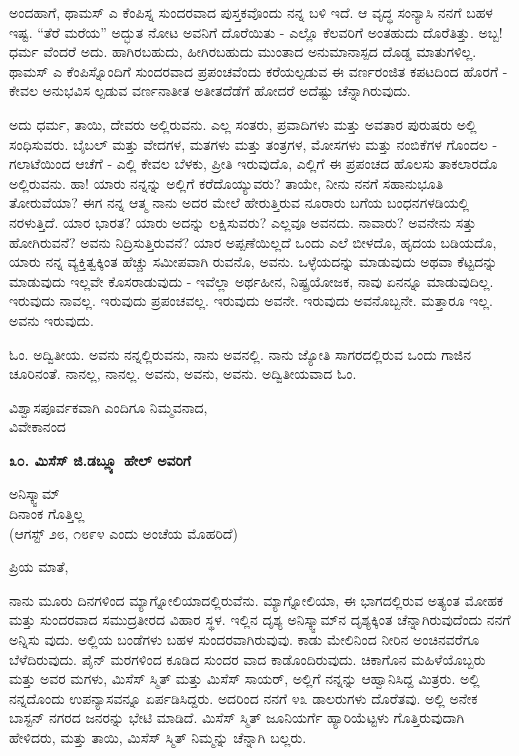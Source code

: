 ಅಂದಹಾಗೆ, ಥಾಮಸ್ ಎ ಕೆಂಪಿಸ್ನ ಸುಂದರವಾದ ಪುಸ್ತಕವೊಂದು ನನ್ನ ಬಳಿ ಇದೆ. ಆ ವೃದ್ಧ ಸಂನ್ಯಾಸಿ ನನಗೆ ಬಹಳ ಇಷ್ಟ. “ತೆರೆ ಮರೆಯ” ಅದ್ಭುತ ನೋಟ ಅವನಿಗೆ ದೊರೆಯಿತು - ಎಲ್ಲೊ ಕೆಲವರಿಗೆ ಅಂತಹುದು ದೊರೆತಿತ್ತು. ಅಬ್ಬ! ಧರ್ಮ ವೆಂದರೆ ಅದು. ಹಾಗಿರಬಹುದು, ಹೀಗಿರಬಹುದು ಮುಂತಾದ ಅನುಮಾನಾಸ್ಪದ ದೊಡ್ಡ ಮಾತುಗಳಿಲ್ಲ. ಥಾಮಸ್ ಎ ಕೆಂಪಿಸ್ನೊಂದಿಗೆ ಸುಂದರವಾದ ಪ್ರಪಂಚವೆಂದು ಕರೆಯಲ್ಪಡುವ ಈ ವರ್ಣರಂಜಿತ ಕಪಟದಿಂದ ಹೊರಗೆ - ಕೇವಲ ಅನುಭವಿಸ ಲ್ಪಡುವ ವರ್ಣನಾತೀತ ಅತೀತದೆಡೆಗೆ ಹೋದರೆ ಅದೆಷ್ಟು ಚೆನ್ನಾಗಿರುವುದು.

ಅದು ಧರ್ಮ, ತಾಯಿ, ದೇವರು ಅಲ್ಲಿರುವನು. ಎಲ್ಲ ಸಂತರು, ಪ್ರವಾದಿಗಳು ಮತ್ತು ಅವತಾರ ಪುರುಷರು ಅಲ್ಲಿ ಸಂಧಿಸುವರು. ಬೈಬಲ್ ಮತ್ತು ವೇದಗಳ, ಮತಗಳು ಮತ್ತು ತಂತ್ರಗಳ, ಮೋಸಗಳು ಮತ್ತು ನಂಬಿಕೆಗಳ ಗೊಂದಲ - ಗಲಾಟೆಯಿಂದ ಆಚೆಗೆ - ಎಲ್ಲಿ ಕೇವಲ ಬೆಳಕು, ಪ್ರೀತಿ ಇರುವುದೊ, ಎಲ್ಲಿಗೆ ಈ ಪ್ರಪಂಚದ ಹೊಲಸು ತಾಕಲಾರದೊ ಅಲ್ಲಿರುವನು. ಹಾ! ಯಾರು ನನ್ನನ್ನು ಅಲ್ಲಿಗೆ ಕರೆದೊಯ್ಯುವರು? ತಾಯೇ, ನೀನು ನನಗೆ ಸಹಾನುಭೂತಿ ತೋರುವೆಯಾ? ಈಗ ನನ್ನ ಆತ್ಮ ನಾನು ಅದರ ಮೇಲೆ ಹೇರುತ್ತಿರುವ ನೂರಾರು ಬಗೆಯ ಬಂಧನಗಳಡಿಯಲ್ಲಿ ನರಳುತ್ತಿದೆ. ಯಾರ ಭಾರತ? ಯಾರು ಅದನ್ನು ಲಕ್ಷಿಸುವರು? ಎಲ್ಲವೂ ಅವನದು. ನಾವಾರು? ಅವನೇನು ಸತ್ತು ಹೋಗಿರುವನೆ? ಅವನು ನಿದ್ರಿಸುತ್ತಿರುವನೆ? ಯಾರ ಅಪ್ಪಣೆಯಿಲ್ಲದೆ ಒಂದು ಎಲೆ ಬೀಳದೊ, ಹೃದಯ ಬಡಿಯದೊ, ಯಾರು ನನ್ನ ವ್ಯಕ್ತಿತ್ವಕ್ಕಿಂತ ಹೆಚ್ಚು ಸಮೀಪವಾಗಿ ರುವನೊ, ಅವನು. ಒಳ್ಳೆಯದನ್ನು ಮಾಡುವುದು ಅಥವಾ ಕೆಟ್ಟದನ್ನು ಮಾಡುವುದು ಇಲ್ಲವೇ ಕೊಸರಾಡುವುದು - ಇವೆಲ್ಲಾ ಅರ್ಥಹೀನ, ನಿಷ್ಪ್ರಯೋಜಕ, ನಾವು ಏನನ್ನೂ ಮಾಡುವುದಿಲ್ಲ. ಇರುವುದು ನಾವಲ್ಲ. ಇರುವುದು ಪ್ರಪಂಚವಲ್ಲ. ಇರುವುದು ಅವನೇ. ಇರುವುದು ಅವನೊಬ್ಬನೇ. ಮತ್ತಾರೂ ಇಲ್ಲ. ಅವನು ಇರುವುದು.

ಓಂ. ಅದ್ವಿತೀಯ. ಅವನು ನನ್ನಲ್ಲಿರುವನು, ನಾನು ಅವನಲ್ಲಿ. ನಾನು ಜ್ಯೋತಿ ಸಾಗರದಲ್ಲಿರುವ ಒಂದು ಗಾಜಿನ ಚೂರಿನಂತೆ. ನಾನಲ್ಲ, ನಾನಲ್ಲ. ಅವನು, ಅವನು, ಅವನು. ಅದ್ವಿತೀಯವಾದ ಓಂ.

\begin{flushright}
ವಿಶ್ವಾಸಪೂರ್ವಕವಾಗಿ ಎಂದಿಗೂ ನಿಮ್ಮವನಾದ,\\ವಿವೇಕಾನಂದ
\end{flushright}

\begin{center}
\textbf{೩೦. ಮಿಸೆಸ್ ಜಿ.ಡಬ್ಲ್ಯೂ ಹೇಲ್ ಅವರಿಗೆ}
\end{center}

\begin{flushright}
ಅನಿಸ್ಕ್ವಾಮ್​\\ದಿನಾಂಕ ಗೊತ್ತಿಲ್ಲ\\(ಆಗಸ್ಟ್ ೨೮, ೧೮೯೪ ಎಂದು ಅಂಚೆಯ ಮೊಹರಿದೆ)
\end{flushright}

ಪ್ರಿಯ ಮಾತೆ,

ನಾನು ಮೂರು ದಿನಗಳಿಂದ ಮ್ಯಾಗ್ನೋಲಿಯಾದಲ್ಲಿರುವೆನು. ಮ್ಯಾಗ್ನೋಲಿಯಾ, ಈ ಭಾಗದಲ್ಲಿರುವ ಅತ್ಯಂತ ಮೋಹಕ ಮತ್ತು ಸುಂದರವಾದ ಸಮುದ್ರತೀರದ ವಿಹಾರ ಸ್ಥಳ. ಇಲ್ಲಿನ ದೃಶ್ಯ ಅನಿಸ್ಕ್ವಾಮ್​ನ ದೃಶ್ಯಕ್ಕಿಂತ ಚೆನ್ನಾಗಿರುವುದೆಂದು ನನಗೆ ಅನ್ನಿಸು ವುದು. ಅಲ್ಲಿಯ ಬಂಡೆಗಳು ಬಹಳ ಸುಂದರವಾಗಿರುವುವು. ಕಾಡು ಮೇಲಿನಿಂದ ನೀರಿನ ಅಂಚಿನವರೆಗೂ ಬೆಳೆದಿರುವುದು. ಪೈನ್ ಮರಗಳಿಂದ ಕೂಡಿದ ಸುಂದರ ವಾದ ಕಾಡೊಂದಿರುವುದು. ಚಿಕಾಗೊನ ಮಹಿಳೆಯೊಬ್ಬರು ಮತ್ತು ಅವರ ಮಗಳು, ಮಿಸೆಸ್ ಸ್ಮಿತ್ ಮತ್ತು ಮಿಸೆಸ್ ಸಾಯರ್, ಅಲ್ಲಿಗೆ ನನ್ನನ್ನು ಆಹ್ವಾನಿಸಿದ್ದ ಮಿತ್ರರು. ಅಲ್ಲಿ ನನ್ನದೊಂದು ಉಪನ್ಯಾಸವನ್ನೂ ಏರ್ಪಡಿಸಿದ್ದರು. ಅದರಿಂದ ನನಗೆ ೪೩ ಡಾಲರುಗಳು ದೊರೆತವು. ಅಲ್ಲಿ ಅನೇಕ ಬಾಸ್ಟನ್ ನಗರದ ಜನರನ್ನು ಭೇಟಿ ಮಾಡಿದೆ. ಮಿಸೆಸ್ ಸ್ಮಿತ್ ಜೂನಿಯರ್ಗೆ ಹ್ಯಾರಿಯೆಟ್ಟಳು ಗೊತ್ತಿರುವುದಾಗಿ ಹೇಳಿದರು, ಮತ್ತು ತಾಯಿ, ಮಿಸೆಸ್ ಸ್ಮಿತ್ ನಿಮ್ಮನ್ನು ಚೆನ್ನಾಗಿ ಬಲ್ಲರು.

